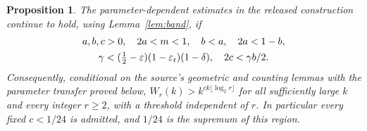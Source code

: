 \documentclass[11pt]{article}
\newtheorem{proposition}{Proposition}
\begin{document}
\begin{proposition}\label{prop:sharpened}
The parameter-dependent estimates in the released construction continue
to hold, using Lemma~\ref{lem:band}, if
\begin{gather*}
 a,b,c>0,\quad 2a<m<1,\quad b<a,\quad 2a<1-b,\\
 \gamma<(\tfrac12-\varepsilon)(1-\varepsilon_{\rm r})(1-\delta),\quad
 2c<\gamma b/2.
\end{gather*}
Consequently, conditional on the source's geometric and counting lemmas
with the parameter transfer proved below, $W_r(k)>k^{ck\lfloor\log_2r\rfloor}$
for all sufficiently large $k$ and every integer $r\ge2$, with a
threshold independent of $r$. In particular every fixed $c<1/24$ is
admitted, and $1/24$ is the supremum of this region.
\end{proposition}
\end{document}
